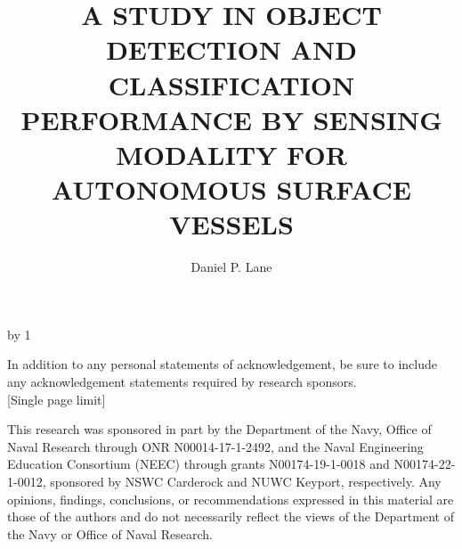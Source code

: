 \documentclass{erauthesis}
\title{A STUDY IN OBJECT DETECTION AND CLASSIFICATION
PERFORMANCE BY SENSING MODALITY FOR AUTONOMOUS
SURFACE VESSELS} %
\author{Daniel P. Lane}
\begin{document}
\frontmatter

\maketitle

\makeatletter 
\advance\fau@frontstage by 1  %


\begin{acknowledgements}

    \raggedright In addition to any personal statements of acknowledgement, be sure to include any acknowledgement statements required by research sponsors.\\{[Single page limit]} 

    \raggedright This research was sponsored in part by the Department of the Navy, Office of Naval Research through ONR N00014-17-1-2492, and the Naval Engineering Education Consortium (NEEC) through grants N00174-19-1-0018 and N00174-22-1-0012, sponsored by NSWC Carderock and NUWC Keyport, respectively. Any opinions, findings, conclusions, or recommendations expressed in this material are those of the authors and do not necessarily reflect the views of the Department of the Navy or Office of Naval Research.
\end{acknowledgements}
\end{document}
